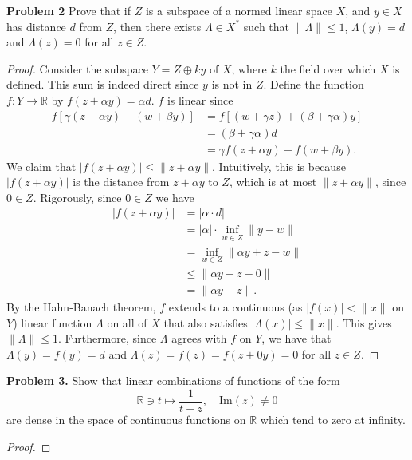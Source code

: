 \documentclass[11pt,letterpaper]{report}
\newcommand{\reals}{\mathbb{R}}
\begin{document}
\noindent\textbf{Problem 2}
Prove that if $Z$ is a subspace of a normed linear space $X$, and $y\in X$ has distance $d$ from $Z$, then there exists $\Lambda\in X^*$ such that $\|\Lambda\|\leq 1$, $\Lambda(y) = d$ and $\Lambda(z) =0$ for all $z\in Z$.
\begin{proof}
	Consider the subspace $Y = Z\oplus ky$ of $X$, where $k$ the field over which $X$ is defined. This sum is indeed direct since $y$ is not in $Z$. Define the function $f: Y\to \reals$ by $f(z + \alpha y) = \alpha d$. $f$ is linear since
	\begin{align*}
		f[\gamma(z+\alpha y) + (w + \beta y)] &= f[(w+\gamma z) + (\beta+\gamma\alpha)y]\\
		&= (\beta+\gamma\alpha)d\\
		&= \gamma f(z+\alpha y) + f(w+\beta y).
	\end{align*}
	We claim that $|f(z+\alpha y)|\leq \|z+\alpha y\|$. Intuitively, this is because $|f(z+\alpha y)|$ is the distance from $z+\alpha y$ to $Z$, which is at most $\|z+\alpha y\|$, since $0\in Z$. Rigorously, since $0\in Z$ we have
	\begin{align*}
		|f(z+\alpha y)| &= |\alpha\cdot d|\\
		&= |\alpha|\cdot \inf_{w\in Z}\|y - w\|\\
		&= \inf_{w\in Z}\|\alpha y + z - w\|\\
		&\leq \|\alpha y+z - 0\|\\
		&= \|\alpha y + z\|.
	\end{align*}
	By the Hahn-Banach theorem, $f$ extends to a continuous (as $|f(x)|<\|x\|$ on $Y$) linear function $\Lambda$ on all of $X$ that also satisfies $|\Lambda(x)|\leq \|x\|$. This gives $\|\Lambda\|\leq 1$. Furthermore, since $\Lambda$ agrees with $f$ on $Y$, we have that $\Lambda(y) = f(y) = d$ and $\Lambda(z) = f(z) = f(z+0y) = 0$ for all $z\in Z$.
\end{proof}

\noindent\textbf{Problem 3. }
Show that linear combinations of functions of the form
\[
\reals \ni t\mapsto \frac{1}{t-z},\quad \text{Im}(z)\neq 0
\]
are dense in the space of continuous functions on $\reals$ which tend to zero at infinity.
\begin{proof}
	
\end{proof}
\end{document}
